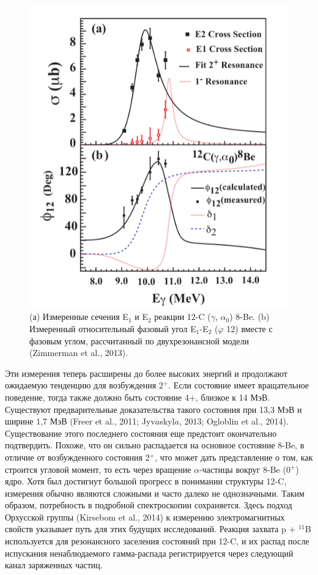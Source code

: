 \documentclass[fontsize=14pt]{scrarticle}
\begin{document}
\begin{figure}[!ht]
\centerline{\includegraphics[scale=.5]{picture4.png}}
\caption{(а) Измеренные сечения E$_{1}$ и E$_{2}$ реакции 12-C ($\gamma$, $\alpha_{0}$) 8-Be. (b) Измеренный относительный фазовый угол E$_{1}$-E$_{2}$ ($\varphi$ 12) вместе с фазовым углом, рассчитанный по двухрезонансной модели (Zimmerman et al., 2013).}
\label{fig3}
\end{figure}
Эти измерения теперь расширены до более высоких энергий и продолжают ожидаемую тенденцию для возбуждения 2$^{+}$. Если состояние имеет вращательное поведение, тогда также должно быть состояние 4+, близкое к 14 МэВ. Существуют предварительные доказательства такого состояния при 13,3 МэВ и ширине 1,7 МэВ (Freer et al., 2011; Jyv$\ddot{a}$skyl$\ddot{a}$, 2013; Ogloblin et al., 2014). Существование этого последнего состояния еще предстоит окончательно подтвердить. Похоже, что он сильно распадается на основное состояние 8-Be, в отличие от возбужденного состояния 2$^{+}$, что может дать представление о том, как строится угловой момент, то есть через вращение $\alpha$-частицы вокруг 8-Be (0$^{+}$) ядро. Хотя был достигнут большой прогресс в понимании структуры 12-C, измерения обычно являются сложными и часто далеко не однозначными. Таким образом, потребность в подробной спектроскопии сохраняется. Здесь подход Орхусской группы (Kirsebom et al., 2014) к измерению электромагнитных свойств указывает путь для этих будущих исследований. Реакция захвата p + $^{11}$B используется для резонансного заселения состояний при 12-C, и их распад после испускания ненаблюдаемого гамма-распада регистрируется через следующий канал заряженных частиц.
\end{document}
